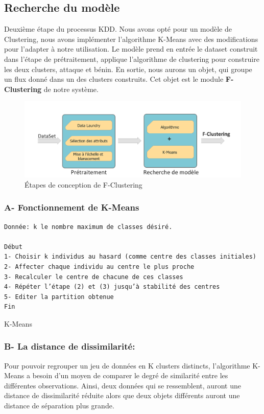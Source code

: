 \subsection{Recherche du modèle}
Deuxième étape du processus KDD. Nous avons opté pour un modèle de Clustering, nous avons implémenter l'algorithme K-Means avec des modifications pour l'adapter à notre utilisation. Le modèle prend en entrée le dataset construit dans l'étape de prétraitement, applique l'algorithme de clustering pour construire les deux clusters, attaque et bénin. En sortie, nous aurons un objet, qui groupe un flux donné dans un des clusters construits. Cet objet est le module \textbf{F-Clustering} de notre système.
\begin{figure}[h]
\centering
\includegraphics[width=\textwidth]{Figures/Diagramme2}
\decoRule
\caption{Étapes de conception de F-Clustering}
\label{fig:F-Clustering_Diagramme}
\end{figure} 

\subsubsection{A- Fonctionnement de K-Means} 
\begin{algorithm}[H]
\begin{verbatim}
Donnée: k le nombre maximum de classes désiré.

Début 
1- Choisir k individus au hasard (comme centre des classes initiales)
2- Affecter chaque individu au centre le plus proche 
3- Recalculer le centre de chacune de ces classes 
4- Répéter l’étape (2) et (3) jusqu’à stabilité des centres 
5- Editer la partition obtenue 
Fin
\end{verbatim}
\caption{K-Means}
\end{algorithm}

\subsubsection{B- La distance de dissimilarité:}
Pour pouvoir regrouper un jeu de données en K clusters distincts, l’algorithme K-Means a besoin d’un moyen de comparer le degré de similarité entre les différentes observations. Ainsi, deux données qui se ressemblent, auront une distance de dissimilarité réduite alors que deux objets différents auront une distance de séparation plus grande.\\

